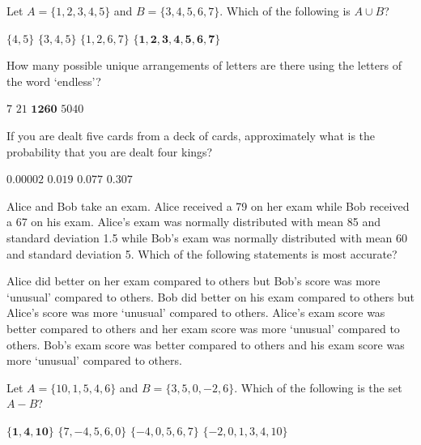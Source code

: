 \documentclass[12pt,letterpaper,answers]{exam}
\begin{document}
\begin{questions}

\question Let $A= \{ 1, 2, 3, 4, 5 \}$ and $B= \{ 3, 4, 5, 6, 7 \}$. Which of the following is $A \cup B$?
	\begin{choices}
	\choice $\{ 4, 5 \}$
	\choice $\{ 3, 4, 5 \}$
	\choice $\{ 1, 2, 6, 7 \}$
	\CorrectChoice $\mathbf{\{ 1, 2, 3, 4, 5, 6, 7 \}}$
	\end{choices}

\vfill 

\question How many possible unique arrangements of letters are there using the letters of the word `endless'?
	\begin{choices}
	\choice $7$
	\choice $21$
	\CorrectChoice $\mathbf{1260}$
	\choice $5040$
	\end{choices}

\vfill

\question If you are dealt five cards from a deck of cards, approximately what is the probability that you are dealt four kings?
	\begin{choices}
	\CorrectChoice $\mathbf{0.00002}$
	\choice $0.019$
	\choice $0.077$
	\choice $0.307$
	\end{choices}

\vfill

\question Alice and Bob take an exam. Alice received a 79 on her exam while Bob received a 67 on his exam. Alice's exam was normally distributed with mean 85 and standard deviation 1.5 while Bob's exam was normally distributed with mean 60 and standard deviation 5. Which of the following statements is most accurate?
	\begin{choices}
	\choice Alice did better on her exam compared to others but Bob's score was more `unusual' compared to others. 
	\CorrectChoice Bob did better on his exam compared to others but Alice's score was more `unusual' compared to others. 
	\choice Alice's exam score was better compared to others and her exam score was more `unusual' compared to others. 
	\choice Bob's exam score was better compared to others and his exam score was more `unusual' compared to others. 
	\end{choices}



\newpage
\vfill


\question Let $A= \{ 10, 1, 5, 4, 6 \}$ and $B= \{ 3, 5, 0, -2, 6 \}$. Which of the following is the set $A - B$?
	\begin{choices}
	\CorrectChoice $\mathbf{\{ 1, 4, 10 \}}$
	\choice $\{ 7, -4, 5, 6, 0 \}$
	\choice $\{ -4, 0, 5, 6, 7 \}$
	\choice $\{ -2, 0, 1, 3, 4, 10 \}$
	\end{choices}


\end{questions}
\end{document}
